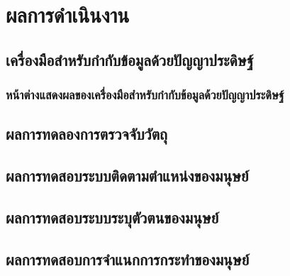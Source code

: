 \chapter{ผลการดำเนินงาน}
\section{เครื่องมือสำหรับกำกับข้อมูลด้วยปัญญาประดิษฐ์}
\subsection{หน้าต่างแสดงผลของเครื่องมือสำหรับกำกับข้อมูลด้วยปัญญาประดิษฐ์}


\clearpage
\section{ผลการทดลองการตรวจจับวัตถุ}

\clearpage
\section{ผลการทดสอบระบบติดตามตำแหน่งของมนุษย์}

\clearpage
\section{ผลการทดสอบระบบระบุตัวตนของมนุษย์}

\clearpage
\section{ผลการทดสอบการจำแนกการกระทำของมนุษย์}
